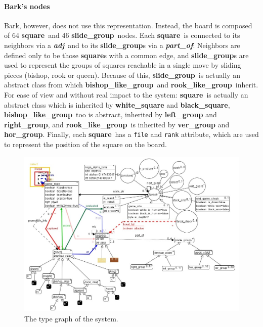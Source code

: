 \documentclass[twocolumn, a4paper]{scrartcl}
\newcommand{\noderepr}[1]{\textsf{\textbf{#1}}}
\newcommand{\edgerepr}[1]{\textit{\textbf{#1}}}
\newcommand{\squarenode}{\noderepr{square}}
\newcommand{\slidegroupnode}{\noderepr{slide\_group}}
\newcommand{\bishopgroupnode}{\noderepr{bishop\_like\_group}}
\newcommand{\rookgroupnode}{\noderepr{rook\_like\_group}}
\newcommand{\adj}{\edgerepr{adj}}
\newcommand{\partof}{\edgerepr{part\_of}}
\begin{document}
    \paragraph{Bark's nodes} Bark, however, does not use this representation. Instead, the board is composed of 64 \squarenode\ and 46 \slidegroupnode\  nodes. Each \squarenode\ is connected to its neighbors via a \adj\ and to its \slidegroupnode s via a \partof. Neighbors are defined only to be those \squarenode s with a common edge, and \slidegroupnode s are used to represent the groups of squares reachable in a single move by sliding pieces (bishop, rook or queen). Because of this, \slidegroupnode\ is actually an abstract class from which \bishopgroupnode\ and \rookgroupnode\ inherit.
    For ease of view and without real impact to the system: \squarenode\ is actually an abstract class which is inherited by \noderepr{white\_square} and \noderepr{black\_square}, \bishopgroupnode\ too is abstract, inherited by \noderepr{left\_group} and \noderepr{right\_group}, and \rookgroupnode\ is inherited by \noderepr{ver\_group} and \noderepr{hor\_group}.
    Finally, each \squarenode\ has a \texttt{file} and \texttt{rank} attribute, which are used to represent the position of the square on the board.
    \begin{figure}[H]
        \centering
        \includegraphics[width=.8\linewidth]{images/type_graph.jpg}
        \caption{The type graph of the system.}
    \end{figure}
\end{document}
